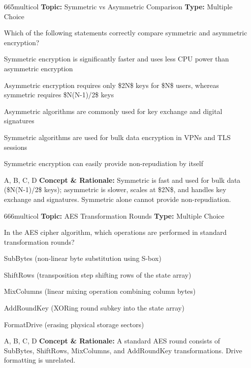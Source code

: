 \begin{qcard}{665}{multicol}
\textcolor{darkslate!75}{\small\textbf{Topic:} Symmetric vs Asymmetric Comparison \hfill \textbf{Type:} Multiple Choice}\vspace{0.4em}\par
Which of the following statements correctly compare symmetric and asymmetric encryption?
\begin{qoptions}
\item Symmetric encryption is significantly faster and uses less CPU power than asymmetric encryption
\item Asymmetric encryption requires only \$2N\$ keys for \$N\$ users, whereas symmetric requires \$N(N-1)/2\$ keys
\item Asymmetric algorithms are commonly used for key exchange and digital signatures
\item Symmetric algorithms are used for bulk data encryption in VPNs and TLS sessions
\item Symmetric encryption can easily provide non-repudiation by itself
\end{qoptions}
\end{qcard}
\nopagebreak
\begin{explainbox}{A, B, C, D}
\textbf{Concept \& Rationale:} Symmetric is fast and used for bulk data (\$N(N-1)/2\$ keys); asymmetric is slower, scales at \$2N\$, and handles key exchange and signatures. Symmetric alone cannot provide non-repudiation.
\end{explainbox}

\begin{qcard}{666}{multicol}
\textcolor{darkslate!75}{\small\textbf{Topic:} AES Transformation Rounds \hfill \textbf{Type:} Multiple Choice}\vspace{0.4em}\par
In the AES cipher algorithm, which operations are performed in standard transformation rounds?
\begin{qoptions}
\item SubBytes (non-linear byte substitution using S-box)
\item ShiftRows (transposition step shifting rows of the state array)
\item MixColumns (linear mixing operation combining column bytes)
\item AddRoundKey (XORing round subkey into the state array)
\item FormatDrive (erasing physical storage sectors)
\end{qoptions}
\end{qcard}
\nopagebreak
\begin{explainbox}{A, B, C, D}
\textbf{Concept \& Rationale:} A standard AES round consists of SubBytes, ShiftRows, MixColumns, and AddRoundKey transformations. Drive formatting is unrelated.
\end{explainbox}

